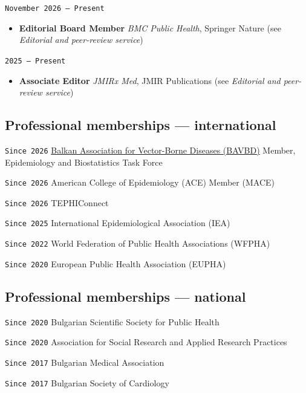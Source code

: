\documentclass[
  10.5pt,
  a4paper,
  DIV=11,
  numbers=noendperiod]{scrartcl}
\providecommand{\tightlist}{%
  \setlength{\itemsep}{0pt}\setlength{\parskip}{0pt}}
\let\oldtexttt\texttt
\renewcommand{\texttt}[1]{{\color{cvbronze}\small\oldtexttt{#1}}}
\begin{document}
\texttt{November\ 2026\ –\ Present}

\begin{itemize}
\tightlist
\item
  \textbf{Editorial Board Member} \textbar{} \emph{BMC Public Health},
  Springer Nature (see \emph{Editorial and peer-review service})
\end{itemize}

\texttt{2025\ –\ Present}

\begin{itemize}
\tightlist
\item
  \textbf{Associate Editor} \textbar{} \emph{JMIRx Med}, JMIR
  Publications (see \emph{Editorial and peer-review service})
\end{itemize}

\subsection{Professional memberships ---
international}\label{professional-memberships-international}

\texttt{Since\ 2026}
\href{https://www.bavbd.org/epidemiology-and-biostatistics-task-force/k-konst}{Balkan
Association for Vector-Borne Diseases (BAVBD)} \textbar{} Member,
Epidemiology and Biostatistics Task Force

\texttt{Since\ 2026} American College of Epidemiology (ACE) \textbar{}
Member (MACE)

\texttt{Since\ 2026} TEPHIConnect

\texttt{Since\ 2025} International Epidemiological Association (IEA)

\texttt{Since\ 2022} World Federation of Public Health Associations
(WFPHA)

\texttt{Since\ 2020} European Public Health Association (EUPHA)

\subsection{Professional memberships ---
national}\label{professional-memberships-national}

\texttt{Since\ 2020} Bulgarian Scientific Society for Public Health

\texttt{Since\ 2020} Association for Social Research and Applied
Research Practices

\texttt{Since\ 2017} Bulgarian Medical Association

\texttt{Since\ 2017} Bulgarian Society of Cardiology
\end{document}
